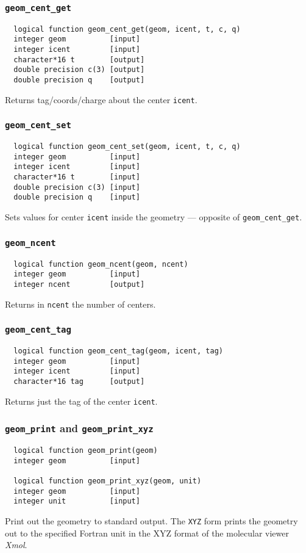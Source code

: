 \subsubsection{{\tt geom\_cent\_get}}
\begin{verbatim}  
  logical function geom_cent_get(geom, icent, t, c, q)
  integer geom          [input]
  integer icent         [input]
  character*16 t        [output]
  double precision c(3) [output]
  double precision q    [output]
\end{verbatim}
Returns tag/coords/charge about the center {\tt icent}.

\subsubsection{{\tt geom\_cent\_set}}
\begin{verbatim}
  logical function geom_cent_set(geom, icent, t, c, q)
  integer geom          [input]
  integer icent         [input]
  character*16 t        [input]
  double precision c(3) [input]
  double precision q    [input]
\end{verbatim}
Sets values for center {\tt icent} inside the geometry --- opposite of
\verb+geom_cent_get+.

\subsubsection{{\tt geom\_ncent}}
\begin{verbatim}
  logical function geom_ncent(geom, ncent)
  integer geom          [input]
  integer ncent         [output]
\end{verbatim}
Returns in {\tt ncent} the number of centers.

\subsubsection{{\tt geom\_cent\_tag}}
\begin{verbatim}
  logical function geom_cent_tag(geom, icent, tag)
  integer geom          [input]
  integer icent         [input]
  character*16 tag      [output]
\end{verbatim}
Returns just the tag of the center {\tt icent}.

\subsubsection{{\tt geom\_print} and {\tt geom\_print\_xyz}}
\begin{verbatim}
  logical function geom_print(geom)
  integer geom          [input]

  logical function geom_print_xyz(geom, unit)
  integer geom          [input]
  integer unit          [input]
\end{verbatim}
Print out the geometry to standard output.  The {\tt XYZ} form prints
the geometry out to the specified Fortran unit in the XYZ format of 
the molecular viewer {\em Xmol}.


